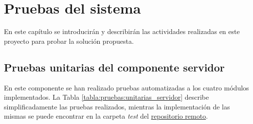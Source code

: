 \chapter{Pruebas del sistema}
\label{chapter:pruebas}
    En este capítulo se introducirán y describirán las actividades realizadas en este proyecto para probar la solución propuesta.

    \section{Pruebas unitarias del componente servidor}

        En este componente se han realizado pruebas automatizadas a los cuatro módulos implementados. La Tabla \ref{tabla:pruebas:unitarias_servidor} describe simplificadamente las pruebas realizados, mientras la implementación de las mismas se puede encontrar en la carpeta \textit{test} del \href{https://github.com/Emotional-Wellbeing/API/tree/main/tests}{repositorio remoto}.


